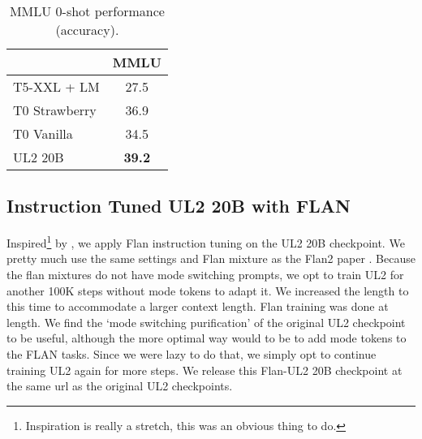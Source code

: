 \documentclass[10pt]{article}
\begin{document}
\begin{table}[H]
\begin{center}
\caption{MMLU 0-shot performance (accuracy).}
\label{table:mmlu}
\begin{tabular}{lc}
\toprule
                     & \multicolumn{1}{l}{MMLU} \\
                     \midrule
T5-XXL + LM  & 27.5                            \\
T0 Strawberry        & 36.9                            \\
T0 Vanilla           & 34.5                            \\
UL2 20B              & \textbf{39.2}                            \\
    \bottomrule
\end{tabular}
\end{center}
\end{table}

\subsection{Instruction Tuned UL2 20B with FLAN}
Inspired\footnote{Inspiration is really a stretch, this was an obvious thing to do.} by \citet{chung2022scaling}, we apply Flan instruction tuning on the UL2 20B checkpoint. We pretty much use the same settings and Flan mixture as the Flan2 paper \citep{chung2022scaling}. Because the flan mixtures do not have mode switching prompts, we opt to train UL2 for another 100K steps without mode tokens to adapt it. We increased the length to  this time to accommodate a larger context length. Flan training was done at  length. We find the `mode switching purification' of the original UL2 checkpoint to be useful, although the more optimal way would to be to add mode tokens to the FLAN tasks. Since we were lazy to do that, we simply opt to continue training UL2 again for more steps. We release this Flan-UL2 20B checkpoint at the same url as the original UL2 checkpoints. 
\end{document}
